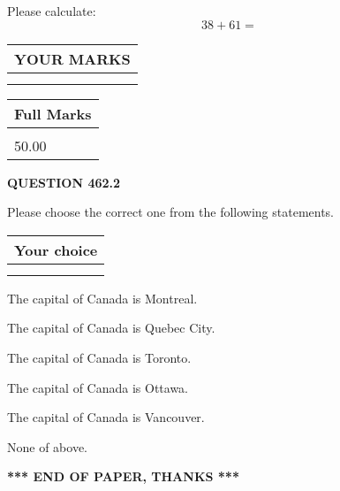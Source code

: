 \documentclass[12pt]{article}
\begin{document}
  
 
Please calculate:
\begin{equation}
38 +  %
61 = \nonumber
\end{equation}
 

 

 
  
\vspace{0.2in}
  
\noindent\begin{tabular}{|l|}
\hline
 YOUR MARKS  \\
\hline
 \\ 
 \\ 
\hline
\end{tabular}
\hspace{0.05in} \begin{tabular}{|l|}
\hline
 Full Marks  \\
\hline
 \\ 
50.00 \\
\hline
\end{tabular}
{\textbf{\Large{QUESTION
462.2 
}}}
  
  
Please choose the correct one from the following statements.
  
  
\noindent\hspace{3.0in} \begin{tabular}{|l|}
\hline
Your choice \\
\hline
 \\ 
 \\ 
\hline
\end{tabular}
  
  
 
 
The capital of Canada is Montreal.
 
 
The capital of Canada is Quebec City.
 
 
The capital of Canada is Toronto.
 
 
The capital of Canada is Ottawa.
 
 
The capital of Canada is Vancouver.
 
 
 None of above.
 
 
   
   
 \vspace{0.2in}
 
   
   
   
   
\vspace{1.0in} 
{\textbf{\large{ *** END OF PAPER, THANKS *** }}} 
   
\end{document}
